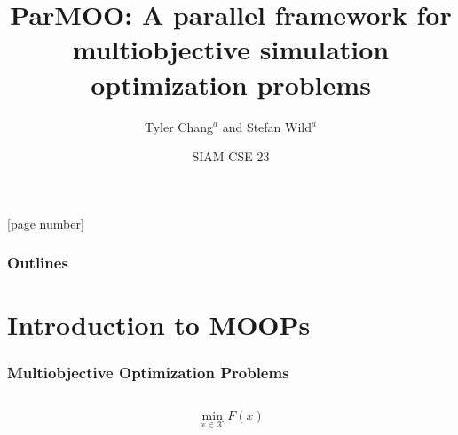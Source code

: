 \documentclass[aspectratio=169]{beamer}
\title{ParMOO: A parallel framework for multiobjective simulation optimization problems}
\author{Tyler Chang$^a$ and Stefan Wild$^a$}
\institute{$^a$Mathematics and Computer Science Division,\\
Argonne National Laboratory}
\date{SIAM CSE 23}
\begin{document}
{
\frame{\titlepage}
}
[page number]{}

\begin{frame}
  \frametitle{Outlines}
  \tableofcontents
\end{frame}


\section{Introduction to MOOPs}

\begin{frame}\frametitle{Multiobjective Optimization Problems}
\begin{columns}
\begin{column}{0.5\textwidth}
{\Large
$$
\min_{x \in \mathcal{X}} F(x)
$$
}


\end{column}
\end{columns}
\end{frame}
\end{document}
